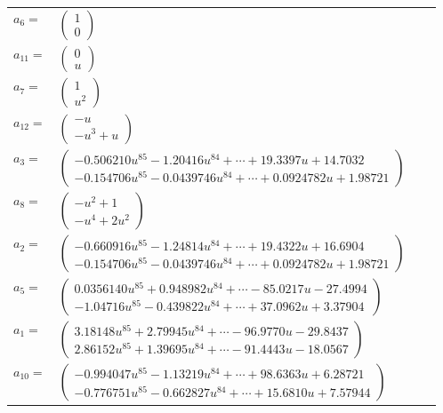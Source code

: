 \documentclass[1p]{elsarticle_modified}
\theoremstyle{definition}
\begin{document}
\begin{tabular}{m{7pt} m{180pt} m{7pt} m{180pt} }
\flushright $a_{6}=$&$\begin{pmatrix}1\\0\end{pmatrix}$ \\
\flushright $a_{11}=$&$\begin{pmatrix}0\\u\end{pmatrix}$ \\
\flushright $a_{7}=$&$\begin{pmatrix}1\\u^2\end{pmatrix}$ \\
\flushright $a_{12}=$&$\begin{pmatrix}- u\\- u^3+u\end{pmatrix}$ \\
\flushright $a_{3}=$&$\begin{pmatrix}-0.506210 u^{85}-1.20416 u^{84}+\cdots+19.3397 u+14.7032\\-0.154706 u^{85}-0.0439746 u^{84}+\cdots+0.0924782 u+1.98721\end{pmatrix}$ \\
\flushright $a_{8}=$&$\begin{pmatrix}- u^2+1\\- u^4+2 u^2\end{pmatrix}$ \\
\flushright $a_{2}=$&$\begin{pmatrix}-0.660916 u^{85}-1.24814 u^{84}+\cdots+19.4322 u+16.6904\\-0.154706 u^{85}-0.0439746 u^{84}+\cdots+0.0924782 u+1.98721\end{pmatrix}$ \\
\flushright $a_{5}=$&$\begin{pmatrix}0.0356140 u^{85}+0.948982 u^{84}+\cdots-85.0217 u-27.4994\\-1.04716 u^{85}-0.439822 u^{84}+\cdots+37.0962 u+3.37904\end{pmatrix}$ \\
\flushright $a_{1}=$&$\begin{pmatrix}3.18148 u^{85}+2.79945 u^{84}+\cdots-96.9770 u-29.8437\\2.86152 u^{85}+1.39695 u^{84}+\cdots-91.4443 u-18.0567\end{pmatrix}$ \\
\flushright $a_{10}=$&$\begin{pmatrix}-0.994047 u^{85}-1.13219 u^{84}+\cdots+98.6363 u+6.28721\\-0.776751 u^{85}-0.662827 u^{84}+\cdots+15.6810 u+7.57944\end{pmatrix}$ \\

\end{tabular}
\end{document}

